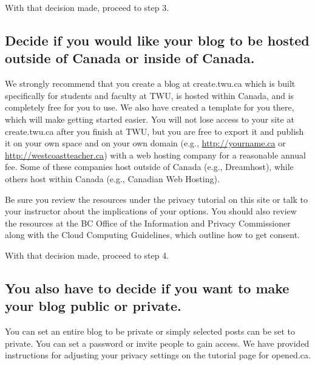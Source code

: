 \documentclass[
]{book}
\begin{document}
With that decision made, proceed to step 3.

\hypertarget{decide-if-you-would-like-your-blog-to-be-hosted-outside-of-canada-or-inside-of-canada.}{%
\subsection*{Decide if you would like your blog to be hosted outside of Canada or inside of Canada.}\label{decide-if-you-would-like-your-blog-to-be-hosted-outside-of-canada-or-inside-of-canada.}}

We strongly recommend that you create a blog at create.twu.ca which is built specifically for students and faculty at TWU, is hosted within Canada, and is completely free for you to use. We also have created a template for you there, which will make getting started easier. You will not lose access to your site at create.twu.ca after you finish at TWU, but you are free to export it and publish it on your own space and on your own domain (e.g., \url{http://yourname.ca} or \url{http://westcoastteacher.ca}) with a web hosting company for a reasonable annual fee. Some of these companies host outside of Canada (e.g., Dreamhost), while others host within Canada (e.g., Canadian Web Hosting).

Be sure you review the resources under the privacy tutorial on this site or talk to your instructor about the implications of your options. You should also review the resources at the BC Office of the Information and Privacy Commissioner along with the Cloud Computing Guidelines, which outline how to get consent.

With that decision made, proceed to step 4.

\hypertarget{you-also-have-to-decide-if-you-want-to-make-your-blog-public-or-private.}{%
\subsection*{You also have to decide if you want to make your blog public or private.}\label{you-also-have-to-decide-if-you-want-to-make-your-blog-public-or-private.}}

You can set an entire blog to be private or simply selected posts can be set to private. You can set a password or invite people to gain access. We have provided instructions for adjusting your privacy settings on the tutorial page for opened.ca.
\end{document}
